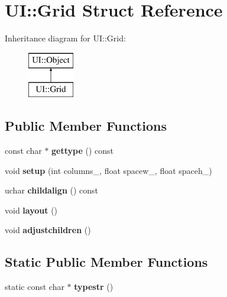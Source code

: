 \hypertarget{struct_u_i_1_1_grid}{}\section{UI\+:\+:Grid Struct Reference}
\label{struct_u_i_1_1_grid}
Inheritance diagram for UI\+:\+:Grid\+:\begin{figure}[H]
\begin{center}
\leavevmode
\includegraphics[height=2.000000cm]{struct_u_i_1_1_grid}
\end{center}
\end{figure}
\subsection*{Public Member Functions}
\begin{DoxyCompactItemize}
\item 
\mbox{\label{struct_u_i_1_1_grid_a8a236da5bb2b9dc64c238536741d227d}} 
const char $\ast$ {\bfseries gettype} () const
\item 
\mbox{\label{struct_u_i_1_1_grid_a58dc4fe7915ddade60578bceab0b261a}} 
void {\bfseries setup} (int columns\+\_\+, float spacew\+\_, float spaceh\+\_)
\item 
\mbox{\label{struct_u_i_1_1_grid_ab088f45a40e2a44e151a58d82a2e3af3}} 
uchar {\bfseries childalign} () const
\item 
\mbox{\label{struct_u_i_1_1_grid_added9e84e7f83d1286f99f8c7964519a}} 
void {\bfseries layout} ()
\item 
\mbox{\label{struct_u_i_1_1_grid_a52b4e41e3d971aadec08b249b71a14d1}} 
void {\bfseries adjustchildren} ()
\end{DoxyCompactItemize}
\subsection*{Static Public Member Functions}
\begin{DoxyCompactItemize}
\item 
\mbox{\label{struct_u_i_1_1_grid_aa1367cc179a538b296e3d4e1166f2644}} 
static const char $\ast$ {\bfseries typestr} ()
\end{DoxyCompactItemize}
